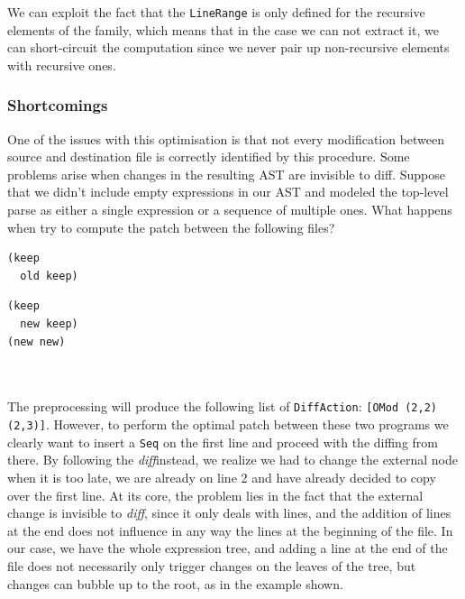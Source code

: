 \documentclass[11pt, titlepage]{article}
\newcommand{\toHaskell}[1]{\texttt{#1}\xspace}
\newcommand{\diff}{\emph{diff}}
\begin{document}
We can exploit the fact that the \toHaskell{LineRange} is only defined for the recursive elements of the family, which means that in the case we can not extract it, we can short-circuit the computation since we never pair up non-recursive elements with recursive ones.

\subsubsection{Shortcomings}
One of the issues with this optimisation is that not every modification between source and destination file is correctly identified by this procedure. Some problems arise when changes in the resulting AST are invisible to diff. Suppose that we didn't include empty expressions in our AST and modeled the top-level parse as either a single expression or a sequence of multiple ones. 
What happens when try to compute the patch between the following files?
\\
\begin{minipage}[t]{0.5\textwidth}
\begin{verbatim}
(keep
  old keep)
\end{verbatim}
\end{minipage}
\begin{minipage}{0.5\textwidth}
\begin{verbatim}
(keep
  new keep)
(new new)
\end{verbatim}
\end{minipage}
\\
\\
The preprocessing will produce the following list of \texttt{DiffAction}:
\toHaskell{[OMod (2,2) (2,3)]}. 
However, to perform the optimal patch between these two programs we clearly want to insert a \texttt{Seq} on the first line and proceed with the diffing from there. 
By following the \diff instead, we realize we had to change the external node when it is too late, we are already on line 2 and have already decided to copy over the first line. 
At its core, the problem lies in the fact that the external change is invisible to \diff, since it only deals with lines, and the addition of lines at the end does not influence in any way the lines at the beginning of the file. 
In our case, we have the whole expression tree, and adding a line at the end of the file does not necessarily only trigger changes on the leaves of the tree, but changes can bubble up to the root, as in the example shown.
\end{document}
